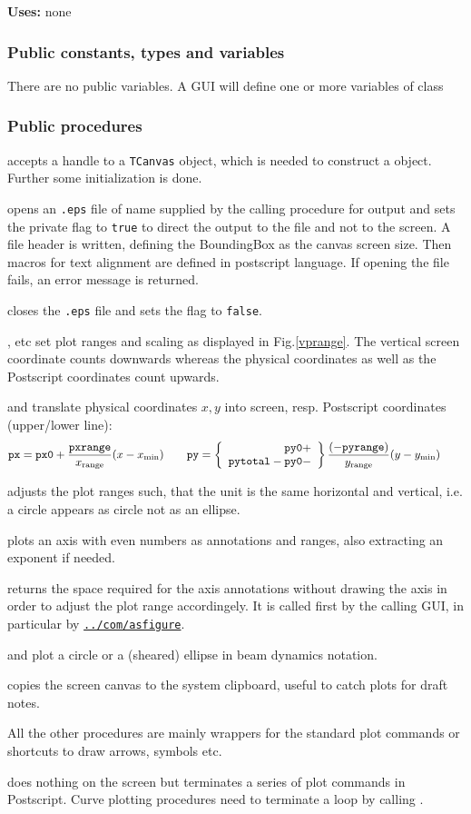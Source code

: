 \documentclass[12pt]{article}
\newcommand\code[1]{{\tt #1}}
\newcommand\guifco[1]{{\color{violet}\code{#1}}}
\newcommand{\opaguif}[1]{\colorbox{violet!30}{\code{#1}}}
\newcommand{\oguif}[1]{\hyperref[#1]{\opaguif{#1}}}
\newcommand{\uses}[1]{{\bf Uses: } #1}
\newcommand{\pvar}[1]{\subsubsection*{Public constants, types and variables} #1}
\newcommand{\ppro}[1]{\subsubsection*{Public procedures} #1}
\begin{document}
\uses{none}

\pvar{
There are no public variables. A GUI will define one or more variables of class \guifco{Vplot}
}

\ppro{
\guifco{Create} accepts a handle to a \code{TCanvas} object, which is needed to construct a \guifco{Vplot} object. Further some initialization is done.

\guifco{PS\_start} opens an \code{*.eps} file of name \guifco{psfile} supplied by the calling procedure for output and sets the private flag \guifco{PS} to \code{true} to direct the output to the file and not to the screen. A file header is written, defining the BoundingBox as the canvas screen size. Then macros for text alignment are defined in postscript language. If opening the file fails, an error message is returned.

\guifco{PS\_stop} closes the \code{*.eps} file and sets the flag \guifco{PS} to \code{false}.

\guifco{SetRange*}, \guifco{SetMargin*} etc set plot ranges and scaling as displayed in Fig.\ref{vprange}. The vertical screen coordinate counts downwards whereas the physical coordinates as well as the Postscript coordinates count upwards. 

\guifco{getpx,getpy} and \guifco{PS\_getpxr,PS\_getpyr} translate physical coordinates $x,y$ into screen, resp. Postscript coordinates (upper/lower line):
\[
{\tt px}={\tt px0}+\frac{\tt pxrange}{x_{\rm range}} (x-x_{\rm min}) \qquad
{\tt py}=\left\{ \begin{array}{r} {\tt py0} + \\ {\tt pytotal} - {\tt py0} -  \end{array} \right\} \frac{(-{\tt pyrange})}{y_{\rm range}} (y-y_{\rm min}) \qquad
\]

\guifco{AdjustAspectRatio} adjusts the plot ranges such, that the unit is the same horizontal and vertical, i.e. a circle appears as circle not as an ellipse.

\guifco{Axis} plots an axis with even numbers as annotations and ranges, also extracting an exponent if needed. 

\guifco{GetAxisSpace} returns the space required for the axis annotations without drawing the axis in order to adjust the plot range accordingely. It is called first by the calling GUI, in particular by \oguif{../com/asfigure}.

\guifco{Circle} and \guifco{Ellipse} plot a circle or a (sheared) ellipse in beam dynamics notation.

\guifco{GrabImage} copies the screen canvas to the system clipboard, useful to catch plots for draft notes.

All the other procedures are mainly wrappers for the standard plot commands or shortcuts to draw arrows, symbols etc.

\guifco{Stroke} does nothing on the screen but terminates a series of plot commands in Postscript. Curve plotting procedures need to terminate a \guifco{LineTo...} loop by calling \guifco{stroke}.
}
\end{document}
